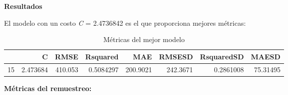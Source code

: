 \documentclass[
]{article}
\begin{document}
\textbf{Resultados}

El modelo con un costo \emph{C} = 2.4736842 es el que proporciona
mejores métricas:

\begin{table}[H]

\caption{\label{tab:unnamed-chunk-24}Métricas del mejor modelo}
\centering
\begin{tabular}[t]{lrrrrrrr}
\toprule
  & C & RMSE & Rsquared & MAE & RMSESD & RsquaredSD & MAESD\\
\midrule
15 & 2.473684 & 410.053 & 0.5084297 & 200.9021 & 242.3671 & 0.2861008 & 75.31495\\
\bottomrule
\end{tabular}
\end{table}

\textbf{Métricas del remuestreo:}
\end{document}
